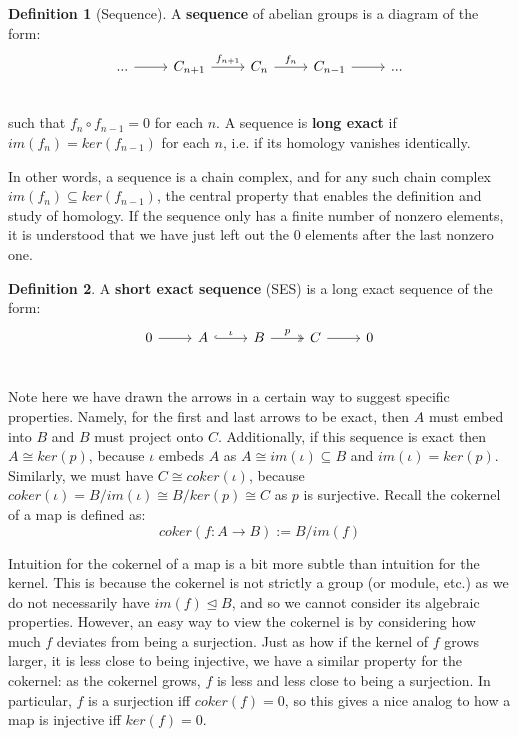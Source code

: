 \documentclass[11pt, oneside]{amsart}   	%
\theoremstyle{definition}
\newtheorem{definition}{Definition}[section]
\begin{document}
\begin{definition}[Sequence]
	A \textbf{sequence} of abelian groups is a diagram of the form:
	\[\begin{tikzcd}
		...\arrow[r] & C_{n + 1}\arrow[r, "f_{n + 1}"] & C_n\arrow[r, "f_{n}"] & C_{n - 1}\arrow[r] & ... \\
	\end{tikzcd}\]
	such that $f_n\circ f_{n - 1} = 0$ for each $n$. A sequence is \textbf{long exact} if $im(f_n) = ker(f_{n - 1})$ for each $n$, 
	i.e. if its homology vanishes identically. 
\end{definition}
In other words, a sequence is a chain complex, and for any such chain complex $im(f_n)\subseteq ker(f_{n - 1})$, the 
central property that enables the definition and study of homology. If the sequence only has a finite number of nonzero 
elements, it is understood that we have just left out the 0 elements after the last nonzero one. 

\begin{definition}
	A \textbf{short exact sequence} (SES) is a long exact sequence of the form:
	\[\begin{tikzcd}
		0\arrow[r] & A\arrow[r, "\iota", hook] & B\arrow[r, "p", twoheadrightarrow] & C\arrow[r] & 0 \\
	\end{tikzcd}\]
\end{definition}
Note here we have drawn the arrows in a certain way to suggest specific properties. Namely, for the first and last arrows to 
be exact, then $A$ must embed into $B$ and $B$ must project onto $C$. Additionally, if this sequence is exact then 
$A\cong ker(p)$, because $\iota$ embeds $A$ as $A\cong im(\iota)\subseteq B$ and $im(\iota) = ker(p)$. Similarly, 
we must have $C\cong coker(\iota)$, because $coker(\iota) = B / im(\iota)\cong B / ker(p)\cong C$ as $p$ is surjective. 
Recall the cokernel of a map is defined as:
\begin{equation}
	coker(f : A\rightarrow B) := B / im(f)
\end{equation}

Intuition for the cokernel of a map is a bit more subtle than intuition for the kernel. This is because 
the cokernel is not strictly a group (or module, etc.) as we do not necessarily have $im(f)\trianglelefteq B$, and so we cannot 
consider its algebraic properties. However, an easy way to view the cokernel is by considering how much $f$ deviates from 
being a surjection. Just as how if the kernel of $f$ grows larger, it is less close to being injective, we have a similar 
property for the cokernel: as the cokernel grows, $f$ is less and less close to being a surjection. In particular, $f$ is a surjection 
iff $coker(f) = 0$, so this gives a nice analog to how a map is injective iff $ker(f) = 0$. 
\end{document}
